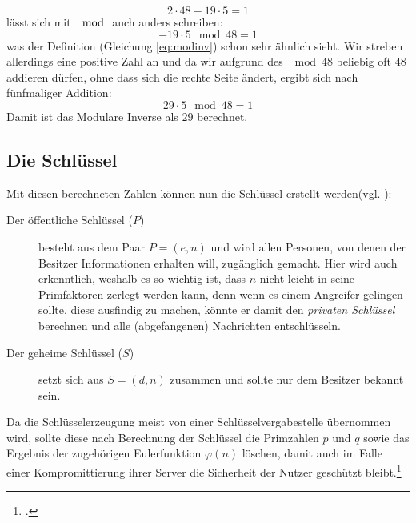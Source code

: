 \documentclass{scrarticle}
\begin{document}
            \newpage
            \begin{equation}
                2\cdot48-19\cdot5=1
            \end{equation}
            lässt sich mit $\mod$ auch anders schreiben:
            \begin{equation}
                -19\cdot5\mod{48}=1
            \end{equation}
            was der Definition (Gleichung \ref{eq:modinv}) schon sehr ähnlich sieht. Wir streben allerdings eine positive Zahl an und da wir aufgrund des $\mod{48}$ beliebig oft $48$ addieren dürfen, ohne dass sich die rechte Seite ändert, ergibt sich nach fünfmaliger Addition:
            \begin{equation}
                29\cdot5\mod{48} = 1
            \end{equation}
            Damit ist das Modulare Inverse als $29$ berechnet.



        \subsection{Die Schlüssel}
            Mit diesen berechneten Zahlen können nun die Schlüssel erstellt werden(vgl. \cite[77]{ertel2003}):
            \begin{description}
                \item[Der öffentliche Schlüssel ($P$)] besteht aus dem Paar $P=(e, n)$ und wird allen Personen, von denen der Besitzer Informationen erhalten will, zugänglich gemacht. Hier wird auch erkenntlich, weshalb es so wichtig ist, dass $n$ nicht leicht in seine Primfaktoren zerlegt werden kann, denn wenn es einem Angreifer gelingen sollte, diese ausfindig zu machen, könnte er damit den \emph{privaten Schlüssel} berechnen und alle (abgefangenen) Nachrichten entschlüsseln.
                \item[Der geheime Schlüssel ($S$)] setzt sich aus $S=(d, n)$ zusammen und sollte nur dem Besitzer bekannt sein. 
            \end{description}
            Da die Schlüsselerzeugung meist von einer Schlüsselvergabestelle übernommen wird, sollte diese nach Berechnung der Schlüssel die Primzahlen $p$ und $q$ sowie das Ergebnis der zugehörigen Eulerfunktion $\varphi(n)$ löschen, damit auch im Falle einer Kompromittierung ihrer Server die Sicherheit der Nutzer geschützt bleibt.\footcite[279]{dankmeier2006}
\end{document}
